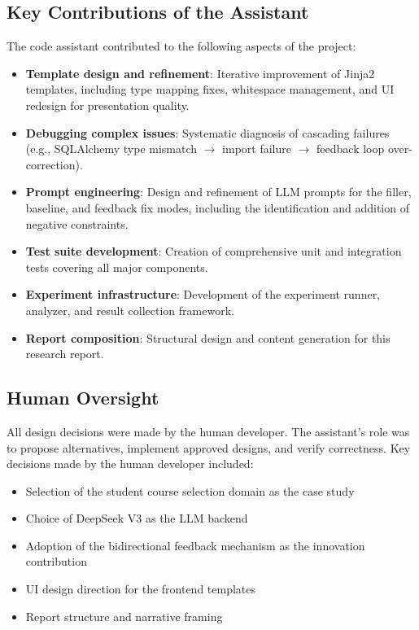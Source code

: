 \documentclass[11pt,a4paper]{article}
\begin{document}
{{\subsection{Key Contributions of the Assistant}

The code assistant contributed to the following aspects of the project:

\begin{itemize}
    \item \textbf{Template design and refinement}: Iterative improvement of Jinja2 templates, including type mapping fixes, whitespace management, and UI redesign for presentation quality.
    \item \textbf{Debugging complex issues}: Systematic diagnosis of cascading failures (e.g., SQLAlchemy type mismatch $\rightarrow$ import failure $\rightarrow$ feedback loop over-correction).
    \item \textbf{Prompt engineering}: Design and refinement of LLM prompts for the filler, baseline, and feedback fix modes, including the identification and addition of negative constraints.
    \item \textbf{Test suite development}: Creation of comprehensive unit and integration tests covering all major components.
    \item \textbf{Experiment infrastructure}: Development of the experiment runner, analyzer, and result collection framework.
    \item \textbf{Report composition}: Structural design and content generation for this research report.
\end{itemize}

\subsection{Human Oversight}

All design decisions were made by the human developer. The assistant's role was to propose alternatives, implement approved designs, and verify correctness. Key decisions made by the human developer included:
\begin{itemize}
    \item Selection of the student course selection domain as the case study
    \item Choice of DeepSeek V3 as the LLM backend
    \item Adoption of the bidirectional feedback mechanism as the innovation contribution
    \item UI design direction for the frontend templates
    \item Report structure and narrative framing
\end{itemize}

}}
\end{document}
